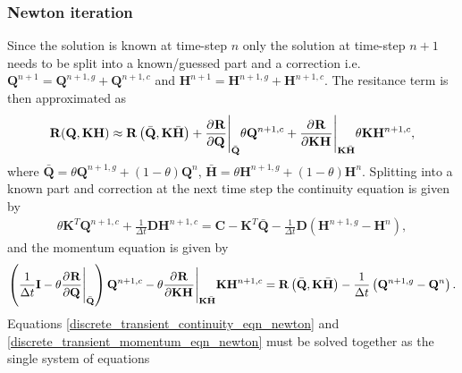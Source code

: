 \subsubsection{Newton iteration} 

Since the solution is known at time-step $n$ only the solution at time-step $n+1$ needs to be split into a known/guessed part and a correction i.e. $\mathbf{Q}^{n+1} = \mathbf{Q}^{n+1,g} + \mathbf{Q}^{n+1,c}$ and $\mathbf{H}^{n+1} = \mathbf{H}^{n+1,g} + \mathbf{H}^{n+1,c}$. The resitance term is then approximated as
\begin{align*}
\mathbf{R}(\mathbf{Q}, \mathbf{K} \mathbf{H}) \approx \mathbf{R}\left(\bar{\mathbf{Q}}, \mathbf{K} \bar{\mathbf{H}} \right) + \frac{\partial^{} \mathbf{R}}{\partial \mathbf{Q}^{}} \Bigg\vert_{\bar{\mathbf{Q}}} \theta \mathbf{Q}^{n+1,c} + \frac{\partial^{} \mathbf{R}}{\partial \mathbf{K} \mathbf{H}^{}} \Bigg\vert_{\mathbf{K} \bar{\mathbf{H}}} \theta \mathbf{K} \mathbf{H}^{n+1,c},
\end{align*}
where $\bar{\mathbf{Q}}=\theta \mathbf{Q}^{n+1,g} + (1-\theta) \mathbf{Q}^{n}$, $\bar{\mathbf{H}}=\theta \mathbf{H}^{n+1,g} + (1-\theta) \mathbf{H}^{n}$. Splitting into a known part and correction at the next time step the continuity equation is given by
\begin{align}\label{discrete_transient_continuity_eqn_newton}
\theta \mathbf{K}^T \mathbf{Q}^{n+1,c} + \frac{1}{\Delta t} \mathbf{D} \mathbf{H}^{n+1,c} = \mathbf{C} - \mathbf{K}^T \bar{\mathbf{Q}} - \frac{1}{\Delta t} \mathbf{D} \left( \mathbf{H}^{n+1,g} - \mathbf{H}^{n} \right),
\end{align}
and the momentum equation is given by
\begin{align}\label{discrete_transient_momentum_eqn_newton}
\left(\frac{1}{\Delta t} \mathbf{I} - \theta \frac{\partial^{} \mathbf{R}}{\partial \mathbf{Q}^{}} \Bigg\vert_{\bar{\mathbf{Q}}} \right) \mathbf{Q}^{n+1,c} - \theta \frac{\partial^{} \mathbf{R}}{\partial \mathbf{K} \mathbf{H}^{}} \Bigg\vert_{\mathbf{K} \bar{\mathbf{H}}} \mathbf{K} \mathbf{H}^{n+1,c} = \mathbf{R}\left(\bar{\mathbf{Q}}, \mathbf{K} \bar{\mathbf{H}} \right) - \frac{1}{\Delta t} \left(\mathbf{Q}^{n+1,g} - \mathbf{Q}^{n} \right).
\end{align} 
Equations \eqref{discrete_transient_continuity_eqn_newton} and \eqref{discrete_transient_momentum_eqn_newton} must be solved together as the single system of equations
